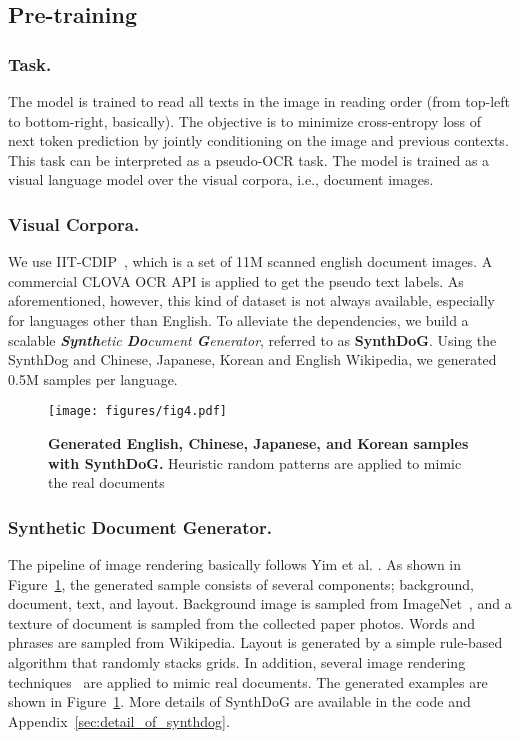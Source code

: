 \documentclass[runningheads]{llncs}
\begin{document}
\subsection{Pre-training} 

\subsubsection{Task.}\label{sec:pretraining}
The model is trained to read all texts in the image in reading order (from top-left to bottom-right, basically).
The objective is to minimize cross-entropy loss of next token prediction by jointly conditioning on the image and previous contexts.
This task can be interpreted as a pseudo-OCR task.
The model is trained as a visual language model over the visual corpora, i.e., document images.

\subsubsection{Visual Corpora.}
We use IIT-CDIP~\cite{iitcdip}, which is a set of 11M scanned english document images. A commercial CLOVA OCR API is applied to get the pseudo text labels.
As aforementioned, however, this kind of dataset is not always available, especially for languages other than English.
To alleviate the dependencies, we build a scalable \textit{\textbf{Synth}etic \textbf{Do}cument \textbf{G}enerator}, referred to as \textbf{SynthDoG}.
Using the SynthDog and Chinese, Japanese, Korean and English Wikipedia, we generated 0.5M samples per language.


\begin{figure}[t!]
    \centering
     \texttt{[image: figures/fig4.pdf]}
    \caption{{\bf Generated English, Chinese, Japanese, and Korean samples with \textbf{SynthDoG}.} Heuristic random patterns are applied to mimic the real documents}\label{fig:synthdog}
\end{figure}

\subsubsection{Synthetic Document Generator.}
The pipeline of image rendering basically follows Yim et al. \cite{synthtiger}.
As shown in Figure~\ref{fig:synthdog}, the generated sample consists of several components; background, document, text, and layout.
Background image is sampled from ImageNet~\cite{deng2009imagenet}, and a texture of document is sampled from the collected paper photos.
Words and phrases are sampled from Wikipedia.
Layout is generated by a simple rule-based algorithm that randomly stacks grids.
In addition, several image rendering techniques~\cite{Gupta16,long2020unrealtext,synthtiger} are applied to mimic real documents.
The generated examples are shown in Figure~\ref{fig:synthdog}.
More details of SynthDoG are available in the code and Appendix~\ref{sec:detail_of_synthdog}. 
\end{document}
